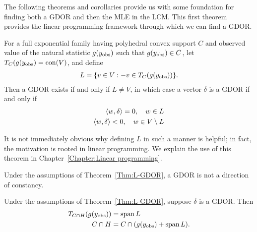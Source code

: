 The following theorems and corollaries provide us with some foundation for
finding both a GDOR and then the MLE in the LCM.
This first theorem provides the linear programming framework through
which we can find a GDOR.  
\begin{theorem} \label{Thm:L-GDOR}
For a full exponential family having polyhedral convex support $C$ and observed value 
of the natural statistic $g(y_{\text{obs}})$ such that $g(y_{\text{obs}}) \in C$, 
let $T_C(g(y_{\text{obs}}) = \operatorname{con}(V)$, and define
\begin{align*}
	L = \{ v \in V: -v \in T_C(g(y_{\text{obs}})) \}.
\end{align*}
Then a GDOR exists if and only if $L \neq V$, in which case a vector $\delta$ is a GDOR if and 
only if
\begin{align*}
	\langle w, \delta \rangle = 0, \quad w \in L \\
	\langle w, \delta \rangle < 0, \quad w \in V \setminus L \\
\end{align*}
\end{theorem}
It is not immediately obvious why defining $L$ in such a manner is helpful; in fact,
the motivation is rooted in linear programming.  We explain the use of this theorem in 
Chapter~\ref{Chapter:Linear programming}.

\begin{corollary}
Under the assumptions of Theorem~\ref{Thm:L-GDOR}, a GDOR is not a direction of constancy.
\end{corollary}

\begin{corollary} \label{Cor:spanL}
Under the assumptions of Theorem~\ref{Thm:L-GDOR}, suppose $\delta$ is a GDOR.  Then
\begin{align*}
	T_{C \cap H} (g(y_{\text{obs}})) &= \operatorname{span} L \\
	C \cap H &= C \cap (g(y_{\text{obs}}) + \operatorname{span} L ). \\
\end{align*}
\end{corollary}

